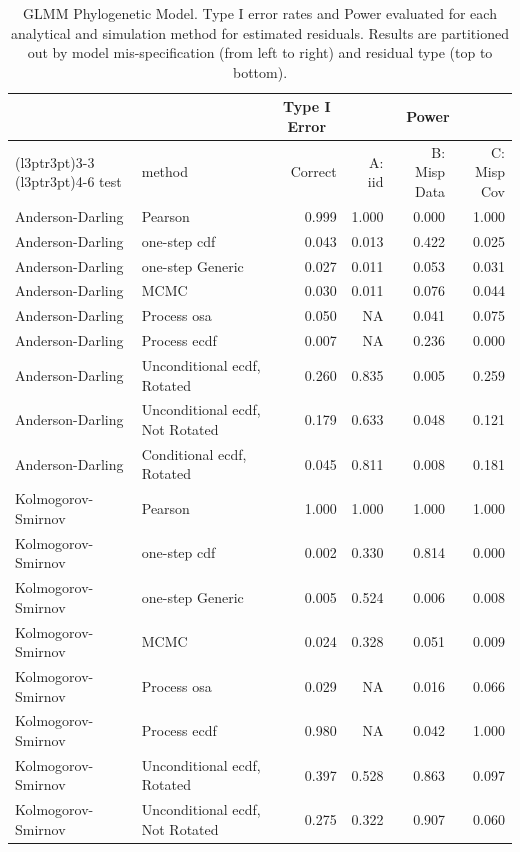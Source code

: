 \documentclass[
]{article}
\begin{document}
\begin{table}[H]
\centering
\caption{\label{tab:phylo-results-glmm-est}GLMM Phylogenetic Model. Type I error rates and Power evaluated for each analytical and simulation method for estimated residuals. Results are partitioned out by model mis-specification (from left to right) and residual type (top to bottom).}
\centering
\begin{tabular}[t]{llrrrr}
\toprule
\multicolumn{1}{c}{ } & \multicolumn{1}{c}{ } & \multicolumn{1}{c}{Type I Error} & \multicolumn{3}{c}{Power} \\
\cmidrule(l{3pt}r{3pt}){3-3} \cmidrule(l{3pt}r{3pt}){4-6}
test & method & Correct & A: iid & B: Misp Data & C: Misp Cov\\
\midrule
Anderson-Darling & Pearson & 0.999 & 1.000 & 0.000 & 1.000\\
Anderson-Darling & one-step cdf & 0.043 & 0.013 & 0.422 & 0.025\\
Anderson-Darling & one-step Generic & 0.027 & 0.011 & 0.053 & 0.031\\
Anderson-Darling & MCMC & 0.030 & 0.011 & 0.076 & 0.044\\
Anderson-Darling & Process osa & 0.050 & NA & 0.041 & 0.075\\
\addlinespace
Anderson-Darling & Process ecdf & 0.007 & NA & 0.236 & 0.000\\
Anderson-Darling & Unconditional ecdf, Rotated & 0.260 & 0.835 & 0.005 & 0.259\\
Anderson-Darling & Unconditional ecdf, Not Rotated & 0.179 & 0.633 & 0.048 & 0.121\\
Anderson-Darling & Conditional ecdf, Rotated & 0.045 & 0.811 & 0.008 & 0.181\\
Kolmogorov- Smirnov & Pearson & 1.000 & 1.000 & 1.000 & 1.000\\
\addlinespace
Kolmogorov- Smirnov & one-step cdf & 0.002 & 0.330 & 0.814 & 0.000\\
Kolmogorov- Smirnov & one-step Generic & 0.005 & 0.524 & 0.006 & 0.008\\
Kolmogorov- Smirnov & MCMC & 0.024 & 0.328 & 0.051 & 0.009\\
Kolmogorov- Smirnov & Process osa & 0.029 & NA & 0.016 & 0.066\\
Kolmogorov- Smirnov & Process ecdf & 0.980 & NA & 0.042 & 1.000\\
\addlinespace
Kolmogorov- Smirnov & Unconditional ecdf, Rotated & 0.397 & 0.528 & 0.863 & 0.097\\
Kolmogorov- Smirnov & Unconditional ecdf, Not Rotated & 0.275 & 0.322 & 0.907 & 0.060\\

\end{tabular}
\end{table}
\end{document}

